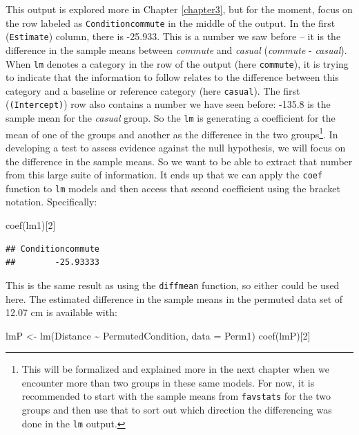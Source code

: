 \documentclass[
]{book}
\newenvironment{Shaded}{\begin{snugshade}}{\end{snugshade}}
\newcommand{\AttributeTok}[1]{\textcolor[rgb]{0.77,0.63,0.00}{#1}}
\newcommand{\DecValTok}[1]{\textcolor[rgb]{0.00,0.00,0.81}{#1}}
\newcommand{\FunctionTok}[1]{\textcolor[rgb]{0.00,0.00,0.00}{#1}}
\newcommand{\NormalTok}[1]{#1}
\newcommand{\OtherTok}[1]{\textcolor[rgb]{0.56,0.35,0.01}{#1}}
\newcommand{\SpecialCharTok}[1]{\textcolor[rgb]{0.00,0.00,0.00}{#1}}
\begin{document}
This output is explored more in Chapter \ref{chapter3}, but for the moment, focus on the row labeled as \texttt{Conditioncommute} in the middle of the output. In the first (\texttt{Estimate}) column, there is -25.933. This is a number we saw before -- it is the difference in the sample means between \emph{commute} and \emph{casual} (\emph{commute} - \emph{casual}). When \texttt{lm} denotes a category in the row of the output (here \texttt{commute}), it is trying to indicate that the information to follow relates to the difference between this category and a baseline or reference category (here \texttt{casual}). The first (\texttt{(Intercept)}) row also contains a number we have seen before: -135.8 is the sample mean for the \emph{casual} group. So the \texttt{lm} is generating a coefficient for the mean of one of the groups and another as the difference in the two groups\footnote{This will be formalized and explained more in the next chapter when we encounter more than two groups in these same models. For now, it is recommended to start with the sample means from \texttt{favstats} for the two groups and then use that to sort out which direction the differencing was done in the \texttt{lm} output.}. In developing a test to assess evidence against the null hypothesis, we will focus on the difference in the sample means. So we want to be able to extract that number from this large suite of information. It ends up that we can apply the \texttt{coef}  function to \texttt{lm} models and then access that second coefficient using the bracket notation. Specifically:

\begin{Shaded}
\begin{Highlighting}[]
\FunctionTok{coef}\NormalTok{(lm1)[}\DecValTok{2}\NormalTok{]}
\end{Highlighting}
\end{Shaded}

\begin{verbatim}
## Conditioncommute 
##        -25.93333
\end{verbatim}

This is the same result as using the \texttt{diffmean} function, so either could be used here. The estimated difference in the sample means in the permuted data set of 12.07 cm is available with:

\begin{Shaded}
\begin{Highlighting}[]
\NormalTok{lmP }\OtherTok{\textless{}{-}} \FunctionTok{lm}\NormalTok{(Distance }\SpecialCharTok{\textasciitilde{}}\NormalTok{ PermutedCondition, }\AttributeTok{data =}\NormalTok{ Perm1)}
\FunctionTok{coef}\NormalTok{(lmP)[}\DecValTok{2}\NormalTok{]}
\end{Highlighting}
\end{Shaded}
\end{document}

